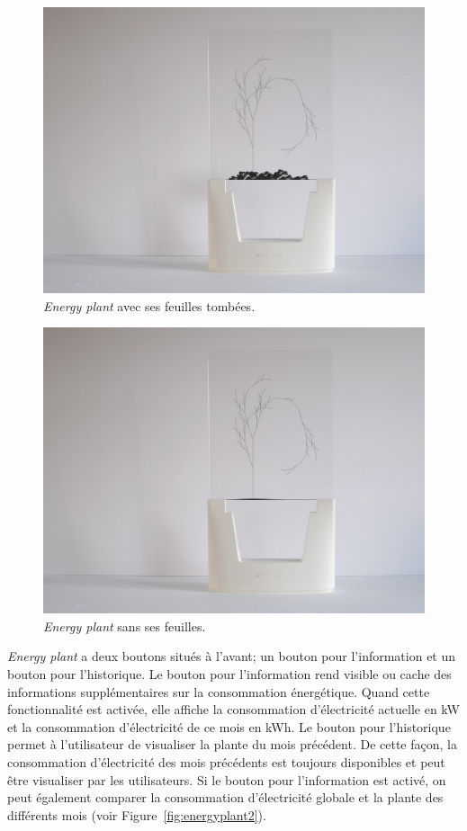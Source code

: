 \documentclass[10pt,a5paper,twoside]{article}
\begin{document}
\begin{figure}
\centering
\includegraphics[]{images/energyplant-screenshot4.jpg}
\caption{\emph{Energy plant} avec ses feuilles
tombées.}\label{fig:energyplant4}
\end{figure}

\begin{figure}
\centering
\includegraphics[]{images/energyplant-screenshot5.jpg}
\caption{\emph{Energy plant} sans ses feuilles.}\label{fig:energyplant5}
\end{figure}

\emph{Energy plant} a deux boutons situés à l'avant; un bouton pour
l'information et un bouton pour l'historique. Le bouton pour
l'information rend visible ou cache des informations supplémentaires sur
la consommation énergétique. Quand cette fonctionnalité est activée,
elle affiche la consommation d'électricité actuelle en kW et la
consommation d'électricité de ce mois en kWh. Le bouton pour
l'historique permet à l'utilisateur de visualiser la plante du mois
précédent. De cette façon, la consommation d'électricité des mois
précédents est toujours disponibles et peut être visualiser par les
utilisateurs. Si le bouton pour l'information est activé, on peut
également comparer la consommation d'électricité globale et la plante
des différents mois (voir Figure~\ref{fig:energyplant2}).
\end{document}
